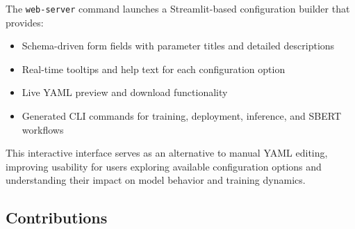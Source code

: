 The \texttt{web-server} command launches a Streamlit-based configuration builder that provides:
\begin{itemize}[leftmargin=*]
    \item Schema-driven form fields with parameter titles and detailed descriptions
    \item Real-time tooltips and help text for each configuration option
    \item Live YAML preview and download functionality
    \item Generated CLI commands for training, deployment, inference, and SBERT workflows
\end{itemize}

This interactive interface serves as an alternative to manual YAML editing, improving usability for users exploring available configuration options and understanding their impact on model behavior and training dynamics.

\subsection{Contributions}

